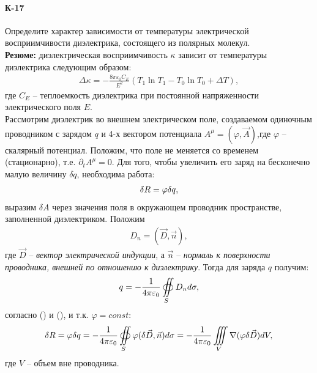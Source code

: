 \documentclass[__main__.tex]{subfiles}
\begin{document}
\paragraph{К-17}
Определите характер зависимости от температуры электрической восприимчивости диэлектрика, состоящего из полярных молекул.\\

\textbf{Резюме:} диэлектрическая восприимчивость $\kappa$ зависит от температуры диэлектрика следующим образом:
\begin{gather}
\Delta\kappa = -\frac{8\pi\varepsilon_0 C_E}{E^2}\left( T_1\ln T_1 - T_0\ln T_0 + \Delta T \right),
\end{gather}
где $C_E$ -- теплоемкость диэлектрика при постоянной напряженности электрического поля $E$.\\

Рассмотрим диэлектрик во внешнем электрическом поле, создаваемом одиночным проводником с зарядом $q$ и 4-х вектором потенциала $A^\mu=(\varphi,\vec{A})$,где $\varphi$ -- скалярный потенциал. Положим, что поле не меняется со временем (стационарно), т.е. $\partial_t A^\mu=0$. Для того, чтобы увеличить его заряд на бесконечно малую величину $\delta q$, необходима работа:
\begin{gather}
\delta R = \varphi\delta q,\llabel{eq:work}
\end{gather}
выразим $\delta A$ через значения поля в окружающем проводник пространстве, заполненной диэлектриком. Положим
\begin{gather}
D_n = (\vec{D},\vec{n}),
\end{gather}
где $\vec{D}$ -- \emph{вектор электрической индукции}, а $\vec{n}$ -- \emph{нормаль к поверхности проводника, внешней по отношению к диэлектрику}. Тогда для заряда $q$ получим:
\begin{gather}
q = -\frac{1}{4\pi\varepsilon_0}\oiint\limits_{S}D_n d\sigma,\llabel{eq:q}
\end{gather}
согласно () и (), и т.к. $\varphi=const$:
\begin{gather}
\delta R = \varphi\delta q =
-\frac{1}{4\pi\varepsilon_0}\oiint\limits_{S}\varphi(\delta\vec{D},\vec{n})d\sigma =
-\frac{1}{4\pi\varepsilon_0}\iiint\limits_{V}\nabla(\varphi\delta\vec{D})dV, \llabel{eq:workq}
\end{gather}
где $V$ -- объем вне проводника.
\end{document}
